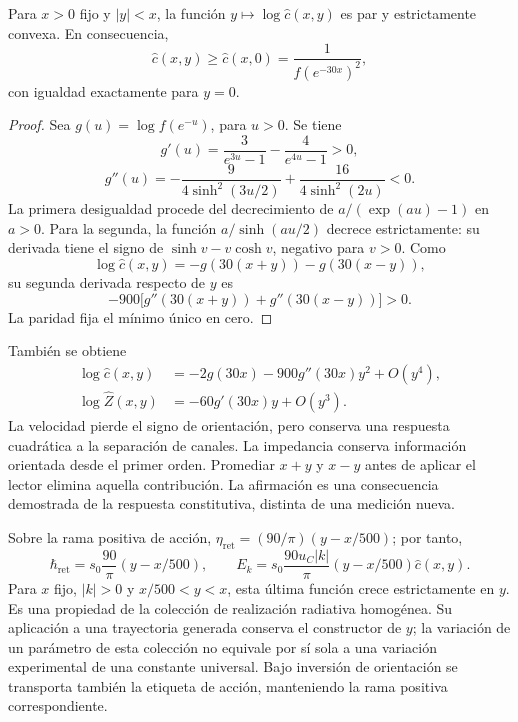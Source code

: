 \begin{proposition}
\label{md:hib:proposicion-convexidad}
Para $x>0$ fijo y $|y|<x$, la función
$y\mapsto\log\widehat c(x,y)$ es par y estrictamente convexa.
En consecuencia,
\begin{equation}
 \widehat c(x,y)\geq\widehat c(x,0)
 =\frac{1}{f(e^{-30x})^2},
 \label{md:hib:cota-velocidad}
\end{equation}
con igualdad exactamente para $y=0$.
\end{proposition}
\begin{proof}
Sea $g(u)=\log f(e^{-u})$, para $u>0$. Se tiene
\begin{equation}
 g'(u)=\frac{3}{e^{3u}-1}-\frac{4}{e^{4u}-1}>0,
 \label{md:hib:derivada-g}
\end{equation}
\begin{equation}
 g''(u)=-\frac{9}{4\sinh^2(3u/2)}
 +\frac{16}{4\sinh^2(2u)}<0.
 \label{md:hib:segunda-g}
\end{equation}
La primera desigualdad procede del decrecimiento de
$a/(\exp(au)-1)$ en $a>0$. Para la segunda, la función
$a/\sinh(au/2)$ decrece estrictamente: su derivada tiene el signo de
$\sinh v-v\cosh v$, negativo para $v>0$. Como
\[
 \log\widehat c(x,y)=-g(30(x+y))-g(30(x-y)),
\]
su segunda derivada respecto de $y$ es
\begin{equation}
 -900\bigl[g''(30(x+y))+g''(30(x-y))\bigr]>0.
 \label{md:hib:segunda-velocidad}
\end{equation}
La paridad fija el mínimo único en cero.
\end{proof}
También se obtiene
\begin{equation}
 \begin{aligned}
 \log\widehat c(x,y)
 &=-2g(30x)-900g''(30x)y^2+O(y^4),\\
 \log\widehat Z(x,y)
 &=-60g'(30x)y+O(y^3).
 \end{aligned}
 \label{md:hib:desarrollos-canales}
\end{equation}
La velocidad pierde el signo de orientación, pero conserva una respuesta
cuadrática a la separación de canales. La impedancia conserva información
orientada desde el primer orden. Promediar $x+y$ y $x-y$ antes de aplicar el
lector elimina aquella contribución. La afirmación es una consecuencia
demostrada de la respuesta constitutiva, distinta de una medición nueva.

Sobre la rama positiva de acción,
$\eta_{\mathrm{ret}}=(90/\pi)(y-x/500)$; por tanto,
\begin{equation}
 \hbar_{\mathrm{ret}}=s_0\frac{90}{\pi}(y-x/500),\qquad
 E_k=s_0\frac{90u_C|k|}{\pi}(y-x/500)\widehat c(x,y).
 \label{md:hib:energia-angular}
\end{equation}
Para $x$ fijo, $|k|>0$ y $x/500<y<x$, esta última función crece
estrictamente en $y$. Es una propiedad de la colección de realización
radiativa homogénea. Su aplicación a una trayectoria generada conserva el
constructor de $y$; la variación de un parámetro de esta colección no equivale
por sí sola a una variación experimental de una constante universal.
Bajo inversión de orientación se transporta también la etiqueta de acción,
manteniendo la rama positiva correspondiente.


